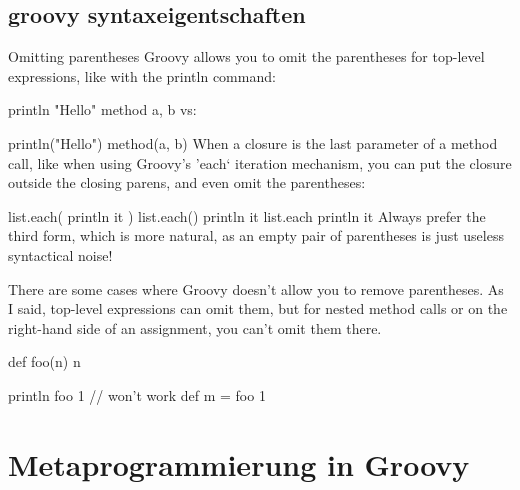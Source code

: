 \documentclass[11pt,english,ngerman, headsepline]{scrreprt}
\begin{document}
\subsection{groovy syntaxeigentschaften}
Omitting parentheses
Groovy allows you to omit the parentheses for top-level expressions, like with the println command:

println "Hello"
method a, b
vs:

println("Hello")
method(a, b)
When a closure is the last parameter of a method call, like when using Groovy's 'each‘ iteration mechanism, you can put the closure outside the closing parens, and even omit the parentheses:

list.each( { println it } )
list.each(){ println it }
list.each  { println it }
Always prefer the third form, which is more natural, as an empty pair of parentheses is just useless syntactical noise!

There are some cases where Groovy doesn't allow you to remove parentheses. As I said, top-level expressions can omit them, but for nested method calls or on the right-hand side of an assignment, you can't omit them there.

def foo(n) { n }

println foo 1 // won't work
def m = foo 1

\section{Metaprogrammierung in Groovy}
\end{document}
